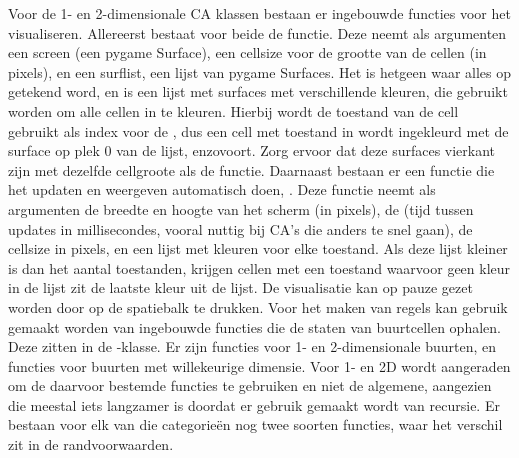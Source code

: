 {}\markdownRendererInterblockSeparator
{}\markdownRendererInterblockSeparator
{}Voor de 1- en 2-dimensionale CA klassen bestaan er ingebouwde functies voor het visualiseren.\markdownRendererInterblockSeparator
{}Allereerst bestaat voor beide de  functie. Deze neemt als argumenten een screen (een pygame Surface), een cellsize voor de grootte van de cellen (in pixels), en een surflist, een lijst van pygame Surfaces.\markdownRendererInterblockSeparator
{}Het  is hetgeen waar alles op getekend word, en  is een lijst met surfaces met verschillende kleuren, die gebruikt worden om alle cellen in te kleuren. Hierbij wordt de toestand van de cell gebruikt als index voor de , dus een cell met toestand in wordt ingekleurd met de surface op plek 0 van de lijst, enzovoort. Zorg ervoor dat deze surfaces vierkant zijn met dezelfde cellgroote als de  functie.\markdownRendererInterblockSeparator
{}\markdownRendererInterblockSeparator
{}Daarnaast bestaan er een functie die het updaten en weergeven automatisch doen, . Deze functie neemt als argumenten de breedte en hoogte van het scherm (in pixels), de  (tijd tussen updates in millisecondes, vooral nuttig bij CA's die anders te snel gaan), de cellsize in pixels, en een lijst met kleuren voor elke toestand. Als deze lijst kleiner is dan het aantal toestanden, krijgen cellen met een toestand waarvoor geen kleur in de lijst zit de laatste kleur uit de lijst.\markdownRendererInterblockSeparator
{}De visualisatie kan op pauze gezet worden door op de spatiebalk te drukken.\markdownRendererInterblockSeparator
{}\markdownRendererInterblockSeparator
{}\markdownRendererInterblockSeparator
{}Voor het maken van regels kan gebruik gemaakt worden van ingebouwde functies die de staten van buurtcellen ophalen. Deze zitten in de -klasse. Er zijn functies voor 1- en 2-dimensionale buurten, en functies voor buurten met willekeurige dimensie. Voor 1- en 2D wordt aangeraden om de daarvoor bestemde functies te gebruiken en niet de algemene, aangezien die meestal iets langzamer is doordat er gebruik gemaakt wordt van recursie. Er bestaan voor elk van die categorieën nog twee soorten functies, waar het verschil zit in de randvoorwaarden.\markdownRendererInterblockSeparator
